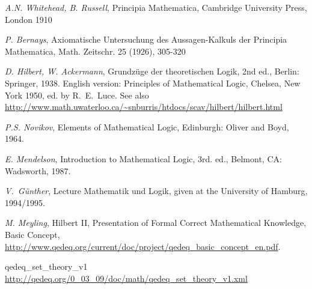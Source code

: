 \documentclass[a4paper,german,10pt,twoside]{book}
\theoremstyle{definition}
\theoremstyle{remark}
\begin{document}

\begin{thebibliography}{99}
 \emph{A.N. Whitehead, B. Russell}, Principia Mathematica, Cambridge University Press, London 1910

 \emph{P. Bernays}, Axiomatische Untersuchung des Aussagen-Kalkuls der {\glqq Principia Mathematica\grqq}, Math. Zeitschr. 25 (1926), 305-320

 \emph{D. Hilbert, W. Ackermann}, Grundz{\"u}ge der theoretischen Logik, 2nd ed., Berlin: Springer, 1938. English version: Principles of Mathematical Logic, Chelsea, New York 1950, ed. by R.~E.~Luce.
See also \url{http://www.math.uwaterloo.ca/~snburris/htdocs/scav/hilbert/hilbert.html}

 \emph{P.S. Novikov}, Elements of Mathematical Logic, Edinburgh: Oliver and Boyd, 1964.

 \emph{E. Mendelson}, Introduction to Mathematical Logic, 3rd. ed., Belmont, CA: Wadsworth, 1987.

 \emph{V.~G{\"u}nther}, Lecture {\glqq Mathematik und Logik\grqq}, given at the University of Hamburg, 1994/1995.

 \emph{M. Meyling}, Hilbert II, Presentation of Formal Correct Mathematical Knowledge, Basic Concept,
\url{http://www.qedeq.org/current/doc/project/qedeq_basic_concept_en.pdf}.



 qedeq\_set\_theory\_v1 \url{http://qedeq.org/0_03_09/doc/math/qedeq_set_theory_v1.xml}


\end{thebibliography}
\backmatter

 \printindex
\end{document}
